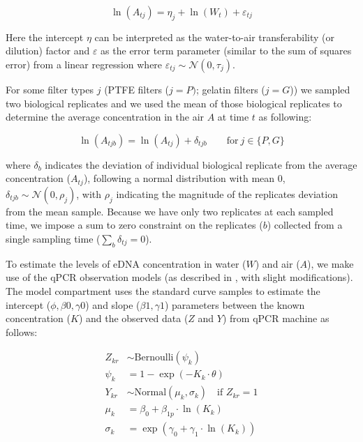 \documentclass{article}
\begin{document}
\begin{equation}
\ln(A_{tj}) = \eta_{j} + \ln(W_{t}) + \varepsilon_{tj}
\end{equation}

Here the intercept $\eta$ can be interpreted as the water-to-air transferability (or dilution) factor and $\varepsilon$  as the error term parameter (similar to the sum of squares error) from a linear regression where $\varepsilon_{tj} \sim \mathcal{N}(0,\tau_j)$.

For some filter types $j$ (PTFE filters (${j=P})$; gelatin filters (${j=G}$)) we sampled two biological replicates and we used the mean of those biological replicates to determine the average concentration in the air $A$ at time $t$ as following:

\begin{equation}
\ln(A_{tjb}) = \ln(A_{tj}) + \delta_{tjb} \qquad \text{for} \ j \in \{P,G\}
\end{equation}


where $\delta_b$ indicates the deviation of individual biological replicate from the average concentration ($A_{tj}$), following a normal distribution with mean 0, $\delta_{tjb} \sim \mathcal{N}(0,\rho_j)$, with $\rho_j$ indicating the magnitude of the replicates deviation from the mean sample. Because we have only two replicates at each sampled time, we impose a sum to zero constraint on the replicates ($b$) collected from a single sampling time ($\sum_b \delta_{tj} = 0$).

To estimate the levels of eDNA concentration in water ($W$) and air ($A$), we make use of the qPCR observation models (as described in \cite{guri2024, shelton2022}, with slight modifications). The model compartment uses the standard curve samples to estimate the intercept ($\phi,\beta0,\gamma0$) and slope ($\beta1, \gamma1$) parameters between the known concentration ($K$) and the observed data ($Z$ and $Y$) from qPCR machine as follows:

\begin{align}
    Z_{kr} &\sim \mathrm{Bernoulli} \left(\psi_{k}\right)  \\
    \psi_{k} &= 1 - \exp(-K_{k} \cdot \theta) \\
    Y_{kr} &\sim \mathrm{Normal} (\mu_{k}, \sigma_{k}) \quad \text{if } Z_{kr} = 1 \\
    \mu_{k} &= \beta_0 + \beta_{1p} \cdot \ln (K_{k}) \\
    \sigma_{k} &= \exp(\gamma_0 + \gamma_1 \cdot \ln (K_{k}))
\end{align}
\end{document}
